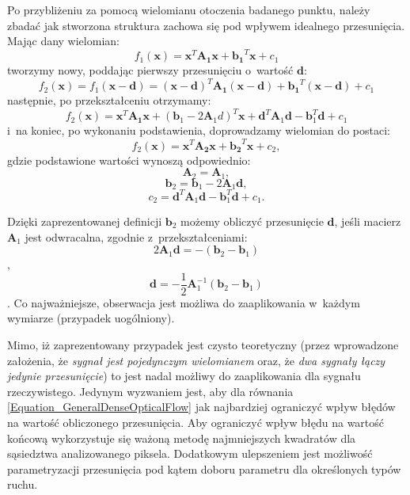    Po przybliżeniu za pomocą wielomianu otoczenia badanego punktu, należy zbadać jak stworzona struktura zachowa się pod wpływem idealnego przesunięcia. Mając dany wielomian: \[ f_{1}(\mathbf{x}) = \mathbf{x}^{T}\mathbf{A_{1}}\mathbf{x} + \mathbf{b_{1}}^{T}\mathbf{x} + c_{1} \] tworzymy nowy, poddając pierwszy przesunięciu o~wartość $\mathbf{d}$: \[
      f_{2}(\mathbf{x}) = f_{1}(\mathbf{x-d}) = (\mathbf{x-d})^{T}\mathbf{A_{1}}(\mathbf{x-d}) + \mathbf{b_{1}}^{T}(\mathbf{x-d}) + c_{1}
    \] następnie, po przekształceniu otrzymamy: \[
        f_{2}(\mathbf{x}) = \mathbf{x}^{T}\mathbf{A_{1}}\mathbf{x} + (\mathbf{b}_{1} - 2\mathbf{A}_{1}d)^{T}\mathbf{x} + \mathbf{d}^{T}\mathbf{A}_{1}\mathbf{d} - \mathbf{b}_{1}^{T}\mathbf{d} + c_{1}
    \] i~na koniec, po wykonaniu podstawienia, doprowadzamy wielomian do postaci: \[
        f_{2}(\mathbf{x}) = \mathbf{x}^{T}\mathbf{A_{2}}\mathbf{x} + \mathbf{b_{2}}^{T}\mathbf{x} + c_{2},
    \] gdzie podstawione wartości wynoszą odpowiednio:
    \[ \mathbf{A}_{2} = \mathbf{A}_{1}, \]
    \[ \mathbf{b}_{2} = \mathbf{b}_{1} - 2\mathbf{A}_{1}\mathbf{d}, \]
    \[ c_{2} = \mathbf{d}^{T}\mathbf{A}_{1}\mathbf{d} - \mathbf{b}_{1}^{T}\mathbf{d} + c_{1}. \]

    Dzięki zaprezentowanej definicji $\mathbf{b}_{2}$ możemy obliczyć przesunięcie $\mathbf{d}$, jeśli macierz $\mathbf{A}_{1}$ jest odwracalna, zgodnie z~przekształceniami:
    \begin{equation}\label{Equation_GeneralDenseOpticalFlow}
      2\mathbf{A}_{1}\mathbf{d} = -(\mathbf{b}_{2} - \mathbf{b}_{1})
    \end{equation},
    \[ \mathbf{d} = -\frac{1}{2}\mathbf{A}_{1}^{-1}(\mathbf{b}_{2} - \mathbf{b}_{1}) \].
    Co najważniejsze, obserwacja jest możliwa do zaaplikowania w~każdym wymiarze (przypadek uogólniony).

    Mimo, iż zaprezentowany przypadek jest czysto teoretyczny (przez wprowadzone założenia, że \textit{sygnał jest pojedynczym wielomianem} oraz, że \textit{dwa sygnały łączy jedynie przesunięcie}) to jest nadal możliwy do zaaplikowania dla sygnału rzeczywistego. Jedynym wyzwaniem jest, aby dla równania \ref{Equation_GeneralDenseOpticalFlow} jak najbardziej ograniczyć wpływ błędów na wartość obliczonego przesunięcia. Aby ograniczyć wpływ błędu na wartość końcową wykorzystuje się ważoną metodę najmniejszych kwadratów dla sąsiedztwa analizowanego piksela. Dodatkowym ulepszeniem jest możliwość parametryzacji przesunięcia pod kątem doboru parametru dla określonych typów ruchu.

